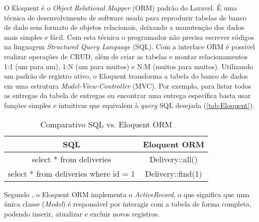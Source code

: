 O Eloquent é o \textit{Object Relational Mapper} (ORM) padrão do Laravel. É uma técnica de desenvolvimento de software usada para reproduzir tabelas de banco de dado sem formato de objetos relacionais, deixando a manutenção dos dados mais simples e fácil. Com esta técnica o programador não precisa escrever códigos na linguagem \textit{Structured Query Language} (SQL). Com a interface ORM é possível realizar operações de CRUD, além de criar as tabelas e montar relacionamentos 1:1 (um para um), 1:N (um para muitos) e N:M (muitos para muitos). Utilizando um padrão de registro ativo, o Eloquent transforma a tabela do banco de dados em uma estrutura \textit{Model-View-Controller} (MVC). Por exemplo, para listar todos as entregas da tabela de entregas ou encontrar uma entrega específica basta usar funções simples e intuitivas que equivalem à \textit{query} SQL desejada (\autoref{tab:Eloquent}).

\begin{table}[H]
    \centering
    \caption{Comparativo SQL vs. Eloquent ORM
    \label{tab:Eloquent}}
\begin{tabular}{|c|c|}
\hline
\textbf{SQL} & \textbf{Eloquent ORM} \\ \hline
select * from deliveries & Delivery::all() \\ \hline
select * from deliveries where id = 1 & Delivery::find(1) \\ \hline
\end{tabular}
\end{table}

Segundo , o Eloquent ORM implementa o \textit{ActiveRecord}, o que significa que uma única classe (\textit{Model}) é responsável por interagir com a tabela de forma completa, podendo inserir, atualizar e excluir novos registros.
